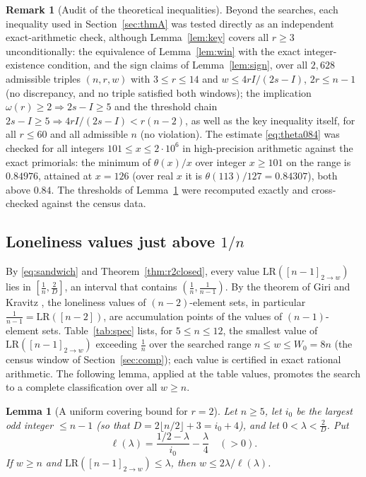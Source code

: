 \documentclass[11pt]{article}
\newtheorem{lemma}[theorem]{Lemma}
\theoremstyle{definition}
\newtheorem{remark}[theorem]{Remark}
\newcommand{\LR}{\mathrm{LR}}
\begin{document}
\begin{remark}[Audit of the theoretical inequalities]\label{rem:audit}
Beyond the searches, each inequality used in
Section~\ref{sec:thmA} was tested directly as an independent
exact-arithmetic check, although Lemma~\ref{lem:key} covers all $r\ge3$
unconditionally: the equivalence of Lemma~\ref{lem:win} with the exact
integer-existence condition, and the sign claims of
Lemma~\ref{lem:sign}, over all $2{,}628$ admissible triples
$(n,r,w)$ with $3\le r\le14$ and $w\le4rI/(2s-I)$, $2r\le n-1$ (no
discrepancy, and no triple satisfied both windows); the implication
$\omega(r)\ge2\Rightarrow2s-I\ge5$ and the threshold chain
$2s-I\ge5\Rightarrow4rI/(2s-I)<r(n-2)$, as well as the key inequality
itself, for all $r\le60$ and all admissible $n$ (no violation). The
estimate \eqref{eq:theta084} was checked for all integers
$101\le x\le2\cdot10^6$ in high-precision arithmetic against the exact
primorials: the minimum of
$\theta(x)/x$ over integer $x\ge101$ on the range is $0.84976$, attained
at $x=126$ (over real $x$ it is $\theta(113)/127=0.84307$), both above
$0.84$. The thresholds of Lemma~\ref{lem:unif} were recomputed exactly
and cross-checked against the census data.
\end{remark}

\subsection{\texorpdfstring{Loneliness values just above $1/n$}{Loneliness values just above 1/n}}\label{sec:spectrum}

By \eqref{eq:sandwich} and Theorem~\ref{thm:r2closed}, every value
$\LR([n-1]_{2\to w})$ lies in $[\frac1n,\frac2D]$, an interval that
contains $(\frac1n,\frac1{n-1})$. By the theorem of Giri and Kravitz
\cite{GiriKravitz2026}, the loneliness values of $(n-2)$-element sets,
in particular $\frac1{n-1}=\LR([n-2])$, are accumulation points of the
values of $(n-1)$-element sets. Table~\ref{tab:spec} lists, for
$5\le n\le12$, the smallest value of $\LR([n-1]_{2\to w})$ exceeding
$\frac1n$ over the searched range $n\le w\le W_0=8n$ (the census window
of Section~\ref{sec:comp}); each value is certified in exact rational
arithmetic. The following lemma, applied at the table values, promotes
the search to a complete classification over all $w\ge n$.

\begin{lemma}[A uniform covering bound for $r=2$]\label{lem:unif}
Let $n\ge5$, let $i_0$ be the largest odd integer $\le n-1$ (so that
$D=2\lfloor n/2\rfloor+3=i_0+4$), and let $0<\lambda<\frac2D$. Put
\[
\ell(\lambda)=\frac{1/2-\lambda}{i_0}-\frac\lambda4\quad(>0).
\]
If $w\ge n$ and $\LR([n-1]_{2\to w})\le\lambda$, then
$w\le2\lambda/\ell(\lambda)$.
\end{lemma}
\end{document}
